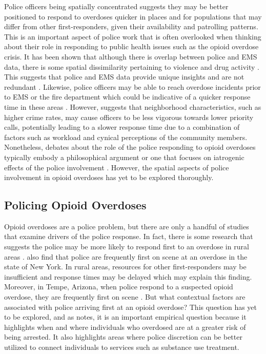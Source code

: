 Police officers being spatially concentrated suggests they may be better positioned to respond to overdoses quicker in places and for populations that may differ from other first-responders, given their availability and patrolling patterns. This is an important aspect of police work that is often overlooked when thinking about their role in responding to public health issues such as the opioid overdose crisis. It has been shown that although there is overlap between police and EMS data, there is some spatial dissimilarity pertaining to violence and drug activity \parencite{hibdon_concentration_2017, hibdon_going_2021}. This suggests that police and EMS data provide unique insights and are not redundant \parencite{hibdon_use_2024}. Likewise, police officers may be able to reach overdose incidents prior to EMS or the fire department which could be indicative of a quicker response time in these areas \parencite{pourtaher_naloxone_2022, white_leveraging_2022}. However, \textcite{klinger_negotiating_1997} suggests that neighborhood characteristics, such as higher crime rates, may cause officers to be less vigorous towards lower priority calls, potentially leading to a slower response time due to a combination of factors such as workload and cynical perceptions of the community members. Nonetheless, debates about the role of the police responding to opioid overdoses typically embody a philosophical argument or one that focuses on iatrogenic effects of the police involvement \parencite{doe-simkins_whose_2022, michaud_therapeutic_2023, van_der_meulen_thats_2021}. However, the spatial aspects of police involvement in opioid overdoses has yet to be explored thoroughly.

\subsection{Policing Opioid Overdoses}

Opioid overdoses are a police problem, but there are only a handful of studies that examine drivers of the police response. In fact, there is some research that suggests the police may be more likely to respond first to an overdose in rural areas \parencite{wood_overdose_2021}. \textcite{pourtaher_naloxone_2022} also find that police are frequently first on scene at an overdose in the state of New York. In rural areas, resources for other first-responders may be insufficient and response times may be delayed which may explain this finding. Moreover, in Tempe, Arizona, when police respond to a suspected opioid overdose, they are frequently first on scene \parencite{white_leveraging_2022}. But what contextual factors are associated with police arriving first at an opioid overdose? This question has yet to be explored, and as \textcite{lowder_twoyear_2020} notes, it is an important empirical question because it highlights when and where individuals who overdosed are at a greater risk of being arrested. It also highlights areas where police discretion can be better utilized to connect individuals to services such as substance use treatment.


